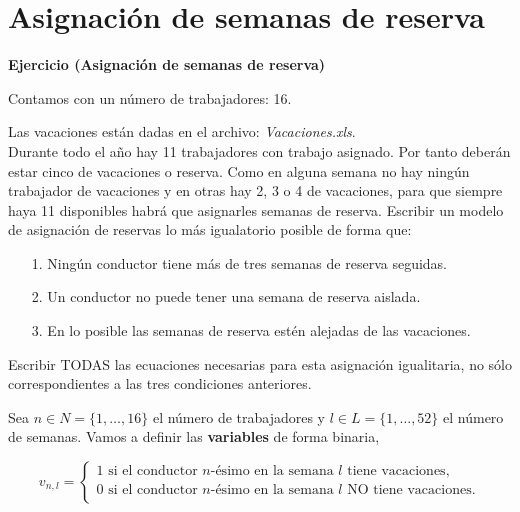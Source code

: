 \documentclass[a4paper,12pt]{article}
\newenvironment{exercise}[1]%
{%
  \par\vspace{\baselineskip}\noindent
  \textbf{Ejercicio (#1)}\begin{itshape}%
  \par\vspace{\baselineskip}\noindent\ignorespaces
}%
{%
  \end{itshape}\ignorespacesafterend
}
\begin{document}
\pagebreak
\tableofcontents
\pagebreak


\section{Asignaci\'on de semanas de reserva}
\begin{exercise}{Asignaci\'on de semanas de reserva}
Contamos con un n\'umero de trabajadores: 16.

Las vacaciones est\'an dadas en el archivo: \textit{Vacaciones.xls}.\\

Durante todo el año hay 11 trabajadores con trabajo asignado. Por tanto deber\'an estar cinco de vacaciones o reserva. Como en alguna semana no hay ning\'un trabajador de vacaciones y en otras hay 2, 3 o 4 de vacaciones, para que siempre haya 11 disponibles habr\'a que asignarles semanas de reserva. Escribir un modelo de asignaci\'on de reservas lo m\'as igualatorio posible de forma que:\\

\begin{itemize}
\item[1.] Ning\'un conductor tiene m\'as de tres semanas de reserva seguidas. \\%

\item[2.] Un conductor no puede tener una semana de reserva aislada. \\%

\item[3.] En lo posible las semanas de reserva est\'en alejadas de las vacaciones.\\ %
\end{itemize}

Escribir TODAS las ecuaciones necesarias para esta asignaci\'on igualitaria, no s\'olo correspondientes a las tres condiciones anteriores.\\

\end{exercise}


Sea $n\in N = \{ 1,\dots,16 \}$ el n\'umero de trabajadores y $l \in L = \{1,\dots,52\}$ el n\'umero de semanas. Vamos a definir las \textbf{variables} de forma binaria,

	\begin{equation*}
	v_{n,l} = \left\lbrace \begin{array}{l}
		1 \text{ si el conductor } n\text{-\'esimo en la semana } l \text{  tiene vacaciones,} \\
		0 \text{ si el conductor } n\text{-\'esimo en la semana } l \text{ NO tiene vacaciones.} \\
	\end{array}
	\right. 
	\end{equation*}
	
\end{document}
